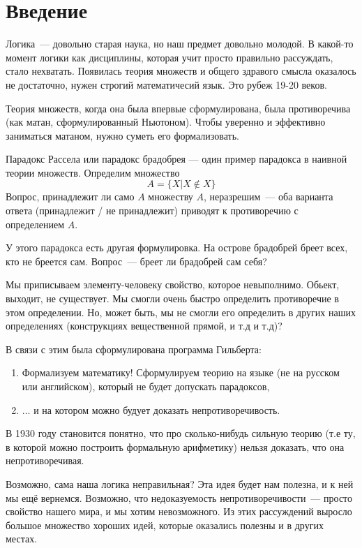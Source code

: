 \section{Введение}
Логика~--- довольно старая наука, но наш предмет довольно молодой.
В какой-то момент логики как дисциплины, которая учит просто правильно рассуждать, стало нехватать.
Появилась теория множеств и общего здравого смысла оказалось не достаточно, нужен строгий математичесий язык. 
Это рубеж 19-20 веков.

Теория множеств, когда она была впервые сформулирована, была противоречива (как матан, сформулированный Ньютоном).
Чтобы уверенно и эффективно заниматься матаном, нужно суметь его формализовать. 

Парадокс Рассела или парадокс брадобрея --- один пример парадокса в наивной теории множеств.
Определим множество 
\[ A = \{ X | X \notin X \}\]
Вопрос, принадлежит ли само $A$ множеству $A$, неразрешим~--- 
оба варианта ответа (принадлежит / не принадлежит) приводят к противоречию с определением $A$.

У этого парадокса есть другая формулировка. 
На острове брадобрей бреет всех, кто не бреется сам. 
Вопрос~--- бреет ли брадобрей сам себя? 

Мы приписываем элементу-человеку свойство, которое невыполнимо.
Обьект, выходит, не существует.
Мы смогли очень быстро определить противоречие в этом определении.
Но, может быть, мы не смогли его определить в других наших определениях
(конструкциях вещественной прямой, и т.д и т.д)?

В связи с этим была сформулирована программа Гильберта:
\begin{enumerate}
\item Формализуем математику!
Сформулируем теорию на языке (не на русском или английском), который не будет допускать парадоксов, 
\item $\ldots$ и на котором можно будует доказать непротиворечивость. 
\end{enumerate}
В 1930 году становится понятно, что про сколько-нибудь сильную теорию (т.е ту, в которой можно построить формальную арифметику) нельзя доказать, что она непротиворечивая.

Возможно, сама наша логика неправильная? 
Эта идея будет нам полезна, и к ней мы ещё вернемся.
Возможно, что недоказуемость непротиворечивости~--- просто свойство нашего мира, и мы хотим невозможного.
Из этих рассуждений выросло большое множество хороших идей, 
которые оказались полезны и в других местах.

